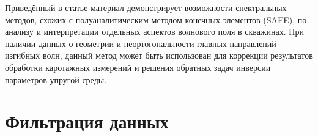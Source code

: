 \documentclass[a4paper,11pt]{article}
\begin{document}

Приведённый в статье материал демонстрирует возможности спектральных методов, схожих с полуаналитическим методом конечных элементов (SAFE), по анализу и интерпретации отдельных аспектов волнового поля в скважинах. При наличии данных о геометрии и неортогональности главных направлений изгибных волн, данный метод может быть использован для коррекции результатов обработки каротажных измерений и решения обратных задач инверсии параметров упругой среды.
%
%


%
%

%


%

\appendix
\section{Фильтрация данных}
\end{document}
